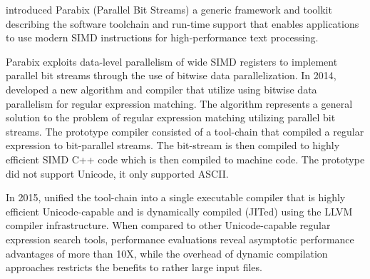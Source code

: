 \citet{parabixorg} introduced Parabix (Parallel Bit Streams) a generic framework and toolkit describing the software toolchain and run-time support that enables applications to use modern SIMD instructions for high-performance text processing.

Parabix exploits data-level parallelism of wide SIMD registers to implement parallel bit streams through the use of bitwise data parallelization. In 2014, \citet{parabixregexnew} developed a new algorithm and compiler that utilize using bitwise data parallelism for regular expression matching. The algorithm represents a general solution to the problem of regular expression matching utilizing parallel bit streams. The prototype compiler consisted of a tool-chain that compiled a regular expression to bit-parallel streams. The bit-stream is then compiled to highly efficient SIMD C++ code which is then compiled to machine code. The prototype did not support Unicode, it only supported ASCII.

In 2015, \citet{parabix} unified the tool-chain into a single executable compiler that is highly efficient Unicode-capable and is dynamically compiled (JITed) using the LLVM compiler infrastructure. When compared to other Unicode-capable regular expression search tools, performance evaluations reveal asymptotic performance advantages of more than 10X, while the overhead of dynamic compilation approaches restricts the benefits to rather large input files.